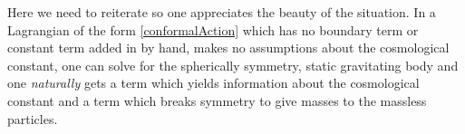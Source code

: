 Here we need to reiterate so one appreciates the beauty of the
situation.  In a Lagrangian of
the form \eqref{conformalAction} which has no boundary term or
constant term added in by hand, makes no assumptions about the
cosmological constant, one can solve for the spherically
symmetry, static gravitating body and one \emph{naturally} gets a
term which yields information about the cosmological constant and
a term which breaks symmetry to give masses to the massless
particles. 
